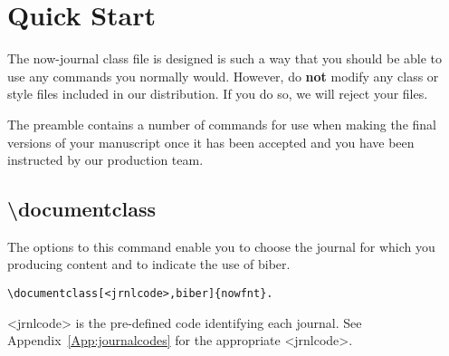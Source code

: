 \documentclass[examplefnt,biber]{nowfnt} %
\begin{document}
\chapter{Quick Start}
\label{prep}

The now-journal class file is designed is such a way that you should be able to use any commands you normally would. 
However, do \textbf{not} modify any class or style files included in our distribution. If you do so, we will reject your files.

The preamble contains
a number of commands for use when making the final versions of your manuscript once it has been accepted and you have been instructed by 
our production team. 

\section{\textbackslash documentclass}
The options to this command enable you to choose the journal for which you 
producing content and to indicate the use of biber.


\begin{verbatim}
\documentclass[<jrnlcode>,biber]{nowfnt}.
\end{verbatim}


\noindent<jrnlcode> is the pre-defined code identifying each journal. See Appendix~\ref{App:journalcodes} for the appropriate <jrnlcode>.\\ 

%

%
\end{document}
